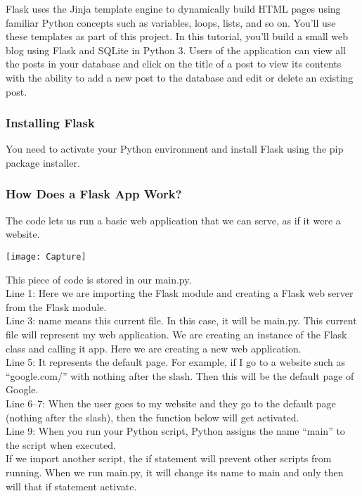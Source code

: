 \documentclass[12pt]{report}
\begin{document}
Flask uses the Jinja template engine to dynamically build HTML pages using familiar Python concepts such as variables, loops, lists, and so on. You’ll use these templates as part of this project.
In this tutorial, you’ll build a small web blog using Flask and SQLite in Python 3. Users of the application can view all the posts in your database and click on the title of a post to view its contents with the ability to add a new post to the database and edit or delete an existing post.
\subsubsection{Installing Flask}
You need to activate your Python environment and install Flask using the pip package installer.
\subsubsection{How Does a Flask App Work?}
The code lets us run a basic web application that we can serve, as if it were a website.\\
\begin{center}
\texttt{[image: Capture]}
\end{center}
This piece of code is stored in our main.py.\\

Line 1: Here we are importing the Flask module and creating a Flask web server from the Flask module.\\

Line 3: name means this current file. In this case, it will be main.py. This current file will represent my web application.
We are creating an instance of the Flask class and calling it app. Here we are creating a new web application.\\

Line 5: It represents the default page. For example, if I go to a website such as “google.com/” with nothing after the slash. Then this will be the default page of Google.\\

Line 6–7: When the user goes to my website and they go to the default page (nothing after the slash), then the function below will get activated.\\

Line 9: When you run your Python script, Python assigns the name “main” to the script when executed.\\

If we import another script, the if statement will prevent other scripts from running. When we run main.py, it will change its name to main and only then will that if statement activate.\\
\end{document}
